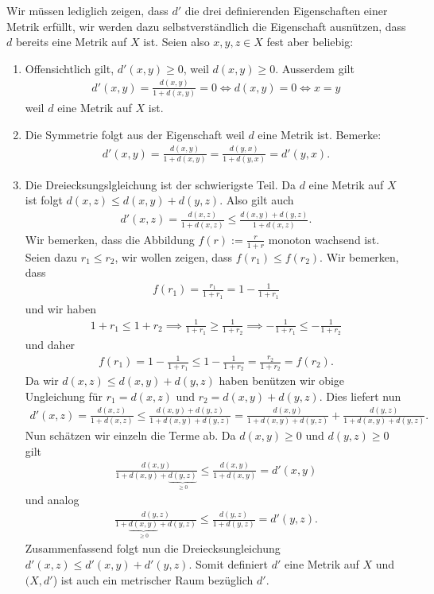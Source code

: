 \documentclass[a4paper, 20]{exam}
\begin{document}
\begin{solution} Wir müssen lediglich zeigen, dass $d'$ die drei definierenden Eigenschaften einer Metrik erfüllt, wir werden dazu selbstverständlich die Eigenschaft ausnützen, dass $d$ bereits eine Metrik auf $X$ ist. Seien also $x,y,z \in X$ fest aber beliebig:
\begin{enumerate}
\item Offensichtlich gilt, $d'(x,y) \geq 0$, weil $d(x,y) \geq 0$. Ausserdem gilt 
\begin{align*}
d'(x,y)= \frac{d(x,y)}{1+d(x,y)}=0 \iff d(x,y)=0 \iff x=y
\end{align*}
weil $d$ eine Metrik auf $X$ ist. 
\item Die Symmetrie folgt aus der Eigenschaft weil $d$ eine Metrik ist. Bemerke:
\begin{align*}
d'(x,y)= \frac{d(x,y)}{1+d(x,y)}= \frac{d(y,x)}{1+d(y,x)}=d'(y,x).
\end{align*}
\item Die Dreiecksungslgleichung ist der schwierigste Teil. Da $d$ eine Metrik auf $X$ ist folgt $d(x,z) \leq d(x,y)+d(y,z)$. Also gilt auch
\begin{align*}
d'(x,z) = \frac{d(x,z)}{1+d(x,z)} \leq \frac{d(x,y)+d(y,z)}{1+d(x,z)}.
\end{align*}
Wir bemerken, dass die Abbildung $f(r):= \frac{r}{1+r}$ monoton wachsend ist. Seien dazu $r_1 \leq r_2$, wir wollen zeigen, dass $f(r_1) \leq f(r_2)$. Wir bemerken, dass 
\begin{align*}
f(r_1) = \frac{r_1}{1+r_1}= 1- \frac{1}{1+r_1}
\end{align*}
und wir haben
\begin{align*}
1+r_1 \leq 1+r_2 \implies \frac{1}{1+r_1} \geq \frac{1}{1+r_2} \implies - \frac{1}{1+r_1} \leq -\frac{1}{1+r_2}
\end{align*}
und daher 
\begin{align*}
f(r_1) = 1- \frac{1}{1+r_1} \leq 1 - \frac{1}{1+r_2} = \frac{r_2}{1+r_2}=f(r_2).
\end{align*}
Da wir $d(x,z) \leq d(x,y)+d(y,z)$ haben benützen wir obige Ungleichung für $r_1= d(x,z)$ und $r_2=d(x,y)+d(y,z)$. Dies liefert nun 
\begin{align*}
d'(x,z)= \frac{d(x,z)}{1+d(x,z)} \leq \frac{d(x,y)+d(y,z)}{1+d(x,y)+d(y,z)} = \frac{d(x,y)}{1+d(x,y)+d(y,z)}+ \frac{d(y,z)}{1+d(x,y)+d(y,z)}.
\end{align*}
Nun schätzen wir einzeln die Terme ab. Da $d(x,y) \geq 0$ und $d(y,z) \geq 0$ gilt
\begin{align*}
\frac{d(x,y)}{1+d(x,y)+\underbrace{d(y,z)}_{\geq 0}} \leq \frac{d(x,y)}{1+d(x,y)}=d'(x,y)
\end{align*}
und analog
\begin{align*}
\frac{d(y,z)}{1+\underbrace{d(x,y)}_{ \geq 0}+d(y,z)} \leq \frac{d(y,z)}{1+d(y,z)}=d'(y,z).
\end{align*}
Zusammenfassend folgt nun die Dreiecksungleichung $d'(x,z) \leq d'(x,y) + d'(y,z)$. Somit definiert $d'$ eine Metrik auf $X$ und $(X,d'$) ist auch ein metrischer Raum bezüglich $d'$. 
\end{enumerate}
\end{solution}
\end{document}
